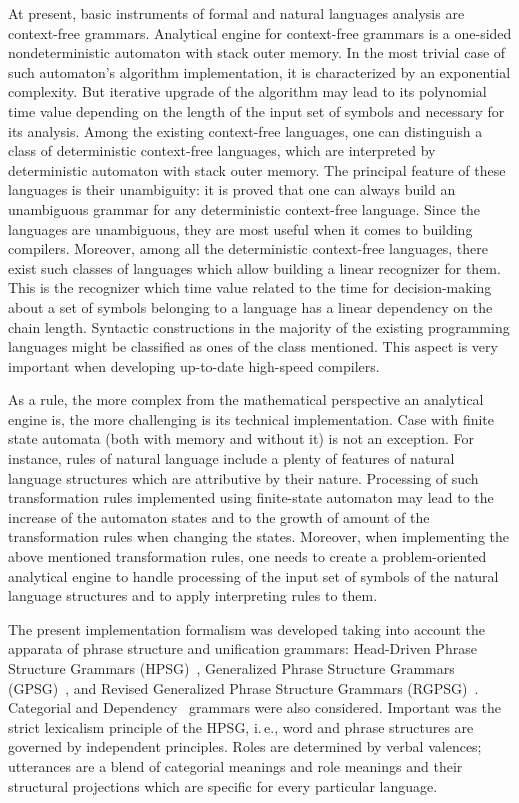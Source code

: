 \begin{multicols}{2}
\noindent
     At present, basic instruments of formal and natural languages analysis are 
context-free grammars. Analytical engine for context-free grammars is a one-sided 
nondeterministic automaton with stack outer memory. In the most trivial case of 
such automaton's algorithm implementation, it is characterized by an exponential 
complexity. But iterative upgrade of the algorithm may lead to its polynomial 
time value depending on the length of the input set of symbols and necessary for its 
analysis. Among the existing context-free languages, one can distinguish a class of 
deterministic context-free languages, which are interpreted by deterministic 
automaton with stack outer memory. The principal feature of these languages is 
their unambiguity: it is proved that one can always build an unambiguous grammar 
for any deterministic context-free language. Since the languages are unambiguous, 
they are most useful when it comes to building compilers. Moreover, among all the 
deterministic context-free languages, there exist such classes of languages which allow 
building a linear recognizer for them. This is the recognizer which time value 
related to the time for decision-making about a set of symbols belonging to a 
language has a linear dependency on the chain length. Syntactic constructions in 
the majority of the existing programming languages might be classified as ones of 
the class mentioned. This aspect is very important when developing up-to-date 
high-speed compilers. 
     
     As a rule, the more complex from the mathematical perspective an analytical 
engine is, the more challenging is its technical implementation. Case with finite 
state automata (both with memory and without it) is not an exception. For instance, 
rules of natural language include a plenty of features of natural language structures 
which are attributive by their nature. Processing of such transformation rules 
implemented using finite-state automaton may lead to the increase of the 
automaton states and to the growth of amount of the transformation rules when 
changing the states. Moreover, when implementing the above mentioned 
transformation rules, one needs to create a problem-oriented analytical engine to 
handle processing of the input set of symbols of the natural language structures and 
to apply interpreting rules to them.
     
The present implementation formalism was developed taking into account the 
apparata of phrase structure and unification grammars: Head-Driven Phrase 
Structure Grammars (HPSG)~\cite{10-koz}, Generalized Phrase Structure 
Grammars (GPSG)~\cite{11-koz}, and Revised Generalized Phrase Structure 
Grammars (RGPSG)~\cite{12-koz}. Categorial and Dependency~\cite{13-koz} 
grammars were also considered. Important was the strict lexicalism principle 
of the HPSG, i.\,e., word and phrase structures are governed by 
independent principles. Roles are determined by verbal valences; utterances are a 
blend of categorial meanings and role meanings and their structural projections 
which are specific for every particular language.
     

\end{multicols}
